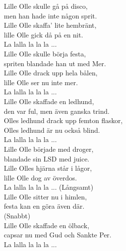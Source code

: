 \documentclass[a6paper,10pt]{article}
\begin{document}
\setlength{\oddsidemargin}{-0.47in}
\begin{center}
\end{center}
\begin{lyrics}
Lille Olle skulle gå på disco, \\
men han hade inte någon sprit.\\ 
Lille Olle skaffa' lite hembränt, \\
lille Olle gick då på en nit. \\
\newline
La lalla la la la ... \\
\newline
Lille Olle skulle börja festa, \\
spriten blandade han ut med Mer. \\
Lille Olle drack upp hela bålen, \\
lille Olle ser nu inte mer. \\
\newline
La lalla la la la ... \\
\newline
Lille Olle skaffade en ledhund,\\ 
den var ful, men även ganska trind. \\
Olles ledhund drack upp femton flaskor,\\ 
Olles ledhund är nu också blind. \\
\newline
La lalla la la la ... \\
\newline 
Lille Olle började med droger, \\
blandade sin LSD med juice. \\
Lille Olles hjärna står i lågor, \\
lille Olle dog av överdos. \\
\newline
La lalla la la la ... 
\setlength{\oddsidemargin}{-0.37in}
\noindent
(Långsamt) \\
Lille Olle sitter nu i himlen, \\
festa kan en göra även där.\\ 
(Snabbt) \\
Lille Olle skaffade en ölback, \\
capsar nu med Gud och Sankte Per. \\
\newline
La lalla la la la ...
\end{lyrics}
\end{document}
